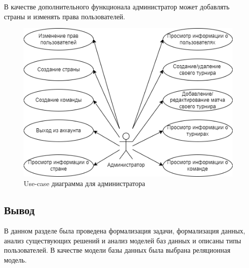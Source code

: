 В качестве дополнительного функционала администратор может добавлять страны и изменять права пользователей.
\begin{figure}
  \centering
  \includegraphics[scale=0.7]{inc/ppo2}
  \caption{Use-case диаграмма для администратора}
  \label{img:ppo2}
\end{figure}

\subsection*{Вывод}
В данном разделе была проведена формализация задачи, формализация данных, анализ существующих решений и анализ моделей баз данных и описаны типы пользователей. В качестве модели базы данных была выбрана реляционная модель.